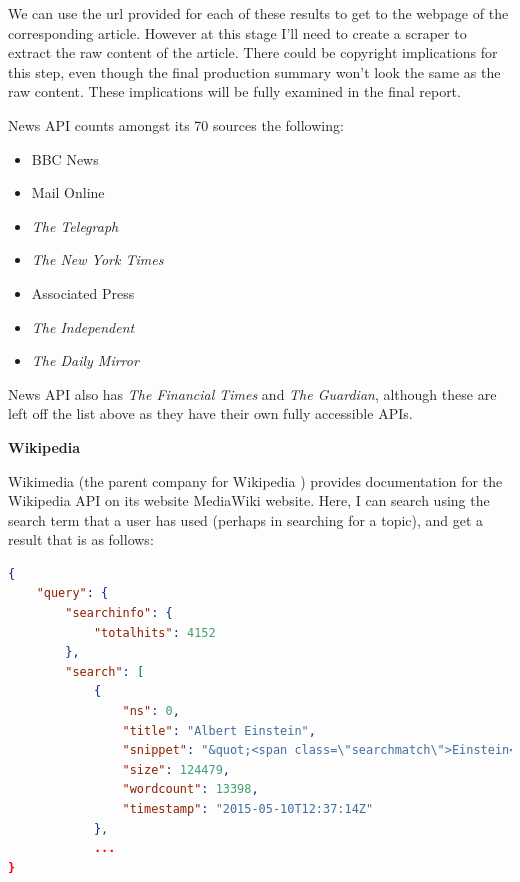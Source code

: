 \documentclass[12pt]{article}
\begin{document}
We can use the url provided for each of these results to get to the webpage of the corresponding article. However at this stage I'll need to create a scraper to extract the raw content of the article. There could be copyright implications for this step, even though the final production summary won't look the same as the raw content. These implications will be fully examined in the final report.

News API counts amongst its 70 sources the following: \\

\begin{itemize}
	\item BBC News 
	\item Mail Online 
	\item \emph{The Telegraph} 
	\item \emph{The New York Times} 
	\item Associated Press 
	\item \emph{The Independent} 
	\item \emph{The Daily Mirror}  \\
\end{itemize}

News API also has \emph{The Financial Times} and \emph{The Guardian}, although these are left off the list above as they have their own fully accessible APIs.  

\textbf{Wikipedia}

Wikimedia (the parent company for Wikipedia \cite{wikipedia}) provides documentation for the Wikipedia API on its website MediaWiki website. Here, I can search using the search term that a user has used (perhaps in searching for a topic), and get a result that is as follows:

\begin{lstlisting}[language=json, firstnumber=1, caption={A sample response to an API call to Wikipedia's API},captionpos=b]
{
    "query": {
        "searchinfo": {
            "totalhits": 4152
        },
        "search": [
            {
                "ns": 0,
                "title": "Albert Einstein",
                "snippet": "&quot;<span class=\"searchmatch\">Einstein</span>&quot; redirects here. For other uses, see <span class=\"searchmatch\">Albert</span> <span class=\"searchmatch\">Einstein</span> (disambiguation) and <span class=\"searchmatch\">Einstein</span> (disambiguation). <span class=\"searchmatch\">Albert</span> <span class=\"searchmatch\">Einstein</span> (/?alb?rt ?a?n?ta?n/; German:",
                "size": 124479,
                "wordcount": 13398,
                "timestamp": "2015-05-10T12:37:14Z"
            },
            ...
}
\end{lstlisting}
\end{document}
